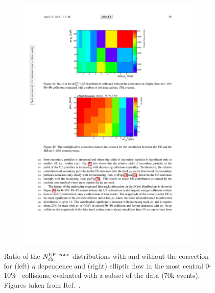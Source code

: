 \begin{figure}
\begin{subfigure}{0.5\textwidth}
\centering \includegraphics[width=1\textwidth]{figures/main/UE/flow_correction.pdf}
\caption{}
\label{fig:flow_corr}
\end{subfigure}
\caption{Ratio of the $\mbox{$N_{\mathrm{ch}}^{\mathrm{UE\ cone}}$}$ distributions with and without the correction for (left) $\eta$ dependence and (right) elliptic flow in the most central 0-10\% \pbpb\ collisions, evaluated with a subset of the data (70k events).
Figures taken from Ref.~\cite{Sickles:2235420}.}
\label{fig:cone_corrections}
\end{figure}




